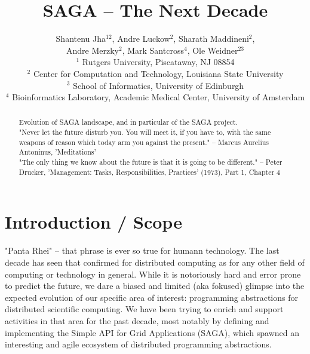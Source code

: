 \documentclass{article}
\begin{document}
\title{\large SAGA -- The Next Decade}

\author{
        Shantenu Jha$^{12}$,
        Andre Luckow$^{2}$,
        Sharath Maddineni$^{2}$,\\
        Andre Merzky$^{2}$,
        Mark Santcross$^{4}$,
        Ole Weidner$^{23}$
        \\[1em]
        $^1$\small
         Rutgers University, 
         Piscataway, NJ 08854\\[-0.3em]
        $^2$ \small
          Center for Computation and Technology, 
          Louisiana State University\\[-0.3em]
        $^3$ \small
          School of Informatics, 
          University of Edinburgh \\[-0.3em]  
        $^4$ \small
         Bioinformatics Laboratory, Academic Medical Center, 
         University of Amsterdam\\[-0.3em]
       }

\maketitle

\begin{abstract}
 Evolution of SAGA landscape, and in particular of the SAGA project.\\

 "Never let the future disturb you. You will meet it, if you have to, 
  with the same weapons of reason which today arm you against the present."
  -- Marcus Aurelius Antoninus, 'Meditations'\\

 "The only thing we know about the future is that it is going to be
 different."
 -- Peter Drucker, 'Management: Tasks, Responsibilities, Practices'
 (1973), Part 1, Chapter 4\\ 
\end{abstract}

\section{Introduction / Scope}

 "Panta Rhei" -- that phrase is ever so true for humann technology.
 The last decade has seen that confirmed for distributed computing as
 for any other field of computing or technology in general.  While it
 is notoriously hard and error prone to predict the future, we dare a
 biased and limited (aka fokused) glimpse into the expected evolution
 of our specific area of interest: programming abstractions for
 distributed scientific computing.  We have been trying to enrich and
 support activities in that area for the past decade, most notably by
 defining and implementing the Simple API for Grid Applications
 (SAGA), which spawned an interesting and agile ecosystem of
 distributed programming abstractions.
\end{document}
